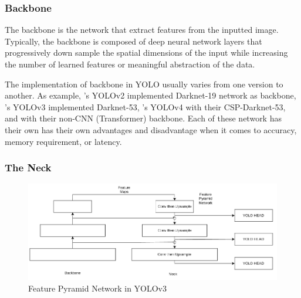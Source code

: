     \subsubsection{Backbone}
    The backbone is the network that extract features from the inputted image.
    Typically, the backbone is composed of deep neural network layers that progressively 
    down sample the spatial dimensions of the input while increasing the number of 
    learned features or meaningful abstraction of the data.

    The implementation of backbone in YOLO usually varies from one version to another.
    As example, \textcite{yolov2}'s YOLOv2 implemented Darknet-19 network as backbone, 
    \textcite{yolov3}'s YOLOv3 implemented Darknet-53, \textcite{yolov4}'s YOLOv4
    with their CSP-Darknet-53, and \textcite{vityolo} with their non-CNN (Transformer) backbone.
    Each of these network has their own has their own advantages and disadvantage when
    it comes to accuracy, memory requirement, or latency.


    \subsubsection{The Neck}
  
    \begin{figure}
        \centering
        \includegraphics[scale=0.55]{figures/yolo-architecture-rough.png}
        \caption{Feature Pyramid Network in YOLOv3}
        \label{fig:yolofpn}
    \end{figure}

